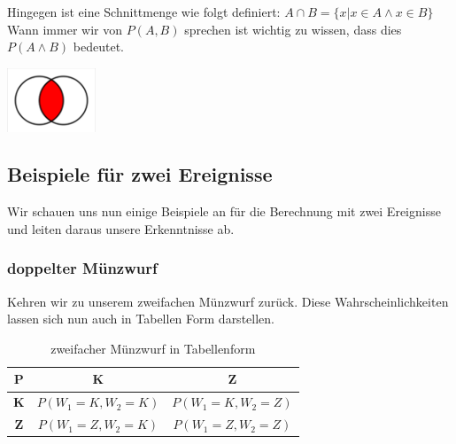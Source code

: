 \documentclass[a4paper]{article}
\newenvironment{Figure}
	{\par\medskip\noindent\minipage{\linewidth}}
	{\endminipage\par\medskip}
\theoremstyle{definition}
\theoremstyle{example}
\begin{document}
Hingegen ist eine Schnittmenge wie folgt definiert:
$A \cap B = \{x | x \in A \wedge x \in B\}$\\
Wann immer wir von $P(A,B)$ sprechen ist wichtig zu wissen, dass dies $P(A \wedge B)$ bedeutet.
\begin{Figure}
\centering
\includegraphics[width=100px]{img/Schnittmenge.png}
	\label{fig:Schnittmengen}
\end{Figure}

\subsection{Beispiele für zwei Ereignisse}
Wir schauen uns nun einige Beispiele an für die Berechnung mit zwei Ereignisse und leiten daraus unsere Erkenntnisse ab.
\subsubsection{doppelter Münzwurf}
Kehren wir zu unserem zweifachen Münzwurf zurück. Diese Wahrscheinlichkeiten lassen sich nun auch in Tabellen Form darstellen.\\

\begin{table}[h!]
	\begin{center}
		\caption{zweifacher Münzwurf in Tabellenform}
		\label{tab: table1}
		\begin{tabular}{c|c|c}
			\textbf{P} & \textbf{K} & \textbf{Z}\\
			\hline
			\textbf{K} & $P(W_1=K, W_2=K)$ & $P(W_1=K, W_2=Z)$\\
			\textbf{Z} & $P(W_1=Z, W_2=K)$ & $P(W_1=Z, W_2=Z)$	
		\end{tabular}
	\end{center}
\end{table}
\end{document}
